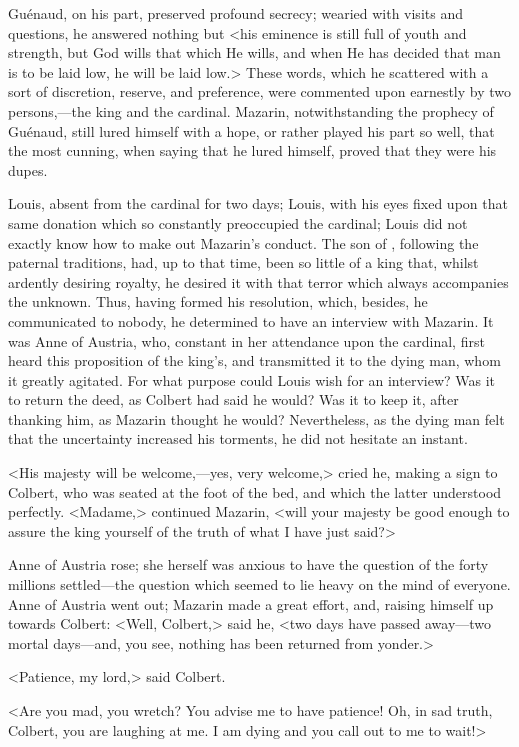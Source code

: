 Guénaud, on his part, preserved profound secrecy; wearied with visits and questions, he answered nothing but <his eminence is still full of youth and strength, but God wills that which He wills, and when He has decided that man is to be laid low, he will be laid low.> These words, which he scattered with a sort of discretion, reserve, and preference, were commented upon earnestly by two persons,—the king and the cardinal. Mazarin, notwithstanding the prophecy of Guénaud, still lured himself with a hope, or rather played his part so well, that the most cunning, when saying that he lured himself, proved that they were his dupes.

Louis, absent from the cardinal for two days; Louis, with his eyes fixed upon that same donation which so constantly preoccupied the cardinal; Louis did not exactly know how to make out Mazarin's conduct. The son of , following the paternal traditions, had, up to that time, been so little of a king that, whilst ardently desiring royalty, he desired it with that terror which always accompanies the unknown. Thus, having formed his resolution, which, besides, he communicated to nobody, he determined to have an interview with Mazarin. It was Anne of Austria, who, constant in her attendance upon the cardinal, first heard this proposition of the king's, and transmitted it to the dying man, whom it greatly agitated. For what purpose could Louis wish for an interview? Was it to return the deed, as Colbert had said he would? Was it to keep it, after thanking him, as Mazarin thought he would? Nevertheless, as the dying man felt that the uncertainty increased his torments, he did not hesitate an instant.

<His majesty will be welcome,—yes, very welcome,> cried he, making a sign to Colbert, who was seated at the foot of the bed, and which the latter understood perfectly. <Madame,> continued Mazarin, <will your majesty be good enough to assure the king yourself of the truth of what I have just said?>

Anne of Austria rose; she herself was anxious to have the question of the forty millions settled—the question which seemed to lie heavy on the mind of everyone. Anne of Austria went out; Mazarin made a great effort, and, raising himself up towards Colbert: <Well, Colbert,> said he, <two days have passed away—two mortal days—and, you see, nothing has been returned from yonder.>

<Patience, my lord,> said Colbert.

<Are you mad, you wretch? You advise me to have patience! Oh, in sad truth, Colbert, you are laughing at me. I am dying and you call out to me to wait!>

